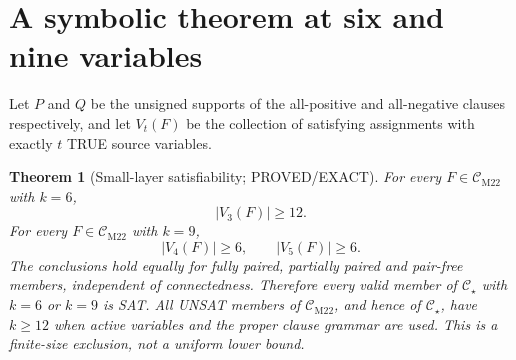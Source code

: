 \documentclass[11pt]{article}
\newtheorem{theorem}{Theorem}
\newcommand{\CM}{\mathcal C_{\mathrm{M22}}}
\newcommand{\CS}{\mathcal C_{\star}}
\begin{document}
\section{A symbolic theorem at six and nine variables}
Let \(P\) and \(Q\) be the unsigned supports of the all-positive and all-negative clauses respectively, and let \(V_t(F)\) be the collection of satisfying assignments with exactly \(t\) TRUE source variables.

\begin{theorem}[Small-layer satisfiability; PROVED/EXACT]\label{th:main}
For every \(F\in\CM\) with \(k=6\),
\[
|V_3(F)|\ge12.
\]
For every \(F\in\CM\) with \(k=9\),
\[
\boxed{|V_4(F)|\ge6,\qquad |V_5(F)|\ge6.}
\]
The conclusions hold equally for fully paired, partially paired and pair-free members, independent of connectedness. Therefore \emph{every} valid member of \(\CS\) with \(k=6\) or \(k=9\) is SAT. All UNSAT members of \(\CM\), and hence of \(\CS\), have \(k\ge12\) when active variables and the proper clause grammar are used. This is a finite-size exclusion, not a uniform lower bound.
\end{theorem}
\end{document}
